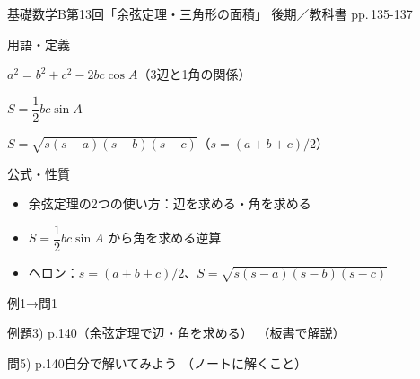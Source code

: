 \documentclass[aspectratio=43,professionalfonts,handout]{beamer}
\newcommand{\LectureNum}{13}
\newcommand{\LectureTitle}{余弦定理・三角形の面積}
\newcommand{\TextPages}{pp.\,135-137}
\newcommand{\CourseName}{基礎数学B}
\renewcommand{\TermName}{後期}
\begin{document}
\begin{frame}{\CourseName\quad 第\LectureNum 回「\LectureTitle 」}
  {\small \TermName\quad \TeacherName\quad ／\quad 教科書 \TextPages}

  \begin{block}{用語・定義}
  \begin{description}[labelwidth=5.5em]
    \item[\kw{余弦定理：$a^2 = b^2 + c^2 - 2bc\cos A$}] $a^2 = b^2 + c^2 - 2bc\cos A$（3辺と1角の関係）
    \item[\kw{面積公式：$S = \frac{1}{2}bc\sin A$}] $S = \dfrac{1}{2}bc\sin A$
    \item[\kw{ヘロンの公式}] $S = \sqrt{s(s-a)(s-b)(s-c)}$（$s = (a+b+c)/2$）
  \end{description}
  \end{block}
\end{frame}

\begin{frame}{公式・性質}
  \begin{block}{}
  \begin{itemize}
    \item 余弦定理の2つの使い方：辺を求める・角を求める
    \item $S = \dfrac{1}{2}bc\sin A$ から角を求める逆算
    \item ヘロン：$s = (a+b+c)/2$、$S = \sqrt{s(s-a)(s-b)(s-c)}$
  \end{itemize}
  \end{block}
\end{frame}

\begin{frame}{例1→問1}
  \begin{exampleblock}{例題3) p.140（余弦定理で辺・角を求める）}
    （板書で解説）
  \end{exampleblock}

  \vfill

  \begin{block}{問5) p.140\quad 自分で解いてみよう}
    （ノートに解くこと）
  \end{block}
\end{frame}
\end{document}
